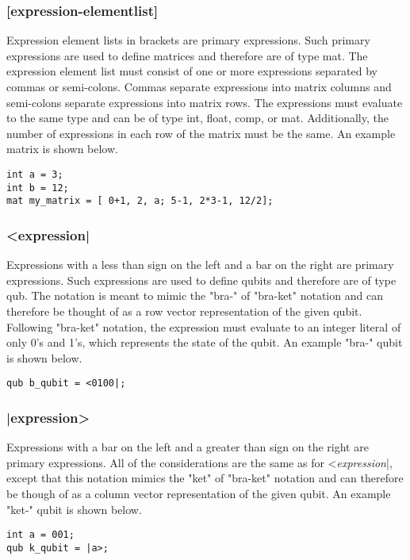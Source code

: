 \subsubsection{[expression-elementlist]}
Expression element lists in brackets are primary expressions. Such primary expressions are used to define matrices and therefore are of type mat. The expression element list must consist of one or more expressions separated by commas or semi-colons. Commas separate expressions into matrix columns and semi-colons separate expressions into matrix rows. The expressions must evaluate to the same type and can be of type int, float, comp, or mat. Additionally, the number of expressions in each row of the matrix must be the same. An example matrix is shown below.

\begin{verbatim}
int a = 3;
int b = 12;
mat my_matrix = [ 0+1, 2, a; 5-1, 2*3-1, 12/2];
\end{verbatim}

\subsubsection{<expression|}
Expressions with a less than sign on the left and a bar on the right are primary expressions. Such expressions are used to define qubits and therefore are of type qub. The notation is meant to mimic the "bra-" of "bra-ket" notation and can therefore be thought of as a row vector representation of the given qubit. Following "bra-ket" notation, the expression must evaluate  to an integer literal of only 0's and 1's, which represents the state of the qubit. An example "bra-" qubit is shown below.

\begin{verbatim}
qub b_qubit = <0100|;
\end{verbatim}

\subsubsection{|expression>}
Expressions with a bar on the left and a greater than sign on the right are primary expressions. All of the considerations are the same as for <\textit{expression}|, except that this notation mimics the "ket" of "bra-ket" notation and can therefore be though of as a column vector representation of the given qubit. An example "ket-" qubit is shown below.

\begin{verbatim}
int a = 001;
qub k_qubit = |a>;
\end{verbatim}


